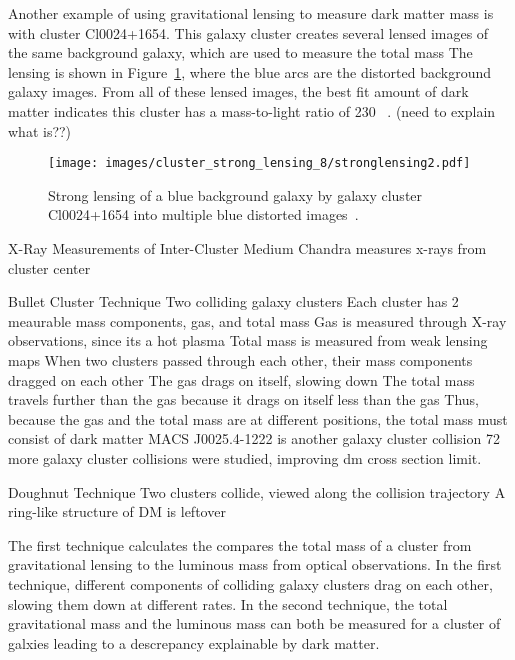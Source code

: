     Another example of using gravitational lensing to measure dark matter mass is with cluster Cl0024+1654.
    This galaxy cluster creates several lensed images of the same background galaxy, which are used to measure the total mass
    The lensing is shown in Figure~\ref{fig:stronglens}, where the blue arcs are the distorted background galaxy images.
    From all of these lensed images, the best fit amount of dark matter indicates this cluster has a mass-to-light ratio of 230 \hMLsol~\cite{cluster_strong_lensing_1996, cluster_strong_lensing_1998, cluster_strong_lensing_2010}.
    {\color{red}(need to explain what \hMLsol is??)}
    
    \begin{figure}
      \centering
      \texttt{[image: images/cluster\_strong\_lensing\_8/stronglensing2.pdf]}
      \caption[Gravitational Lensing in Cl0024+1654]{
        Strong lensing of a blue background galaxy by galaxy cluster Cl0024+1654 into multiple blue distorted images~\cite{cluster_strong_lensing_1996}.
      }
      \label{fig:stronglens}
    \end{figure}
    
    X-Ray Measurements of Inter-Cluster Medium
    Chandra measures x-rays from cluster center
    \cite{cluster_chandra}
    
    Bullet Cluster Technique
    Two colliding galaxy clusters
    Each cluster has 2 meaurable mass components, gas, and total mass
    Gas is measured through X-ray observations, since its a hot plasma
    Total mass is measured from weak lensing maps
    When two clusters passed through each other, their mass components dragged on each other
    The gas drags on itself, slowing down
    The total mass travels further than the gas because it drags on itself less than the gas
    Thus, because the gas and the total mass are at different positions, the total mass must consist of dark matter
    \cite{bullet_cluster_composite}
    \cite{bullet_cluster}
    \cite{bullet_cluster2}
    MACS J0025.4-1222 is another galaxy cluster collision
    \cite{cluster_MACS}
    72 more galaxy cluster collisions were studied, improving dm cross section limit.
    \cite{cluster_72}
    
    Doughnut Technique
    Two clusters collide, viewed along the collision trajectory
    A ring-like structure of DM is leftover
    \cite{dm_doughnut}
    

    

  
    The first technique calculates the 
compares the total mass of a cluster from gravitational lensing to the luminous mass from optical observations.
    In the first technique, different components of colliding galaxy clusters drag on each other, slowing them down at different rates.
    In the second technique, the total gravitational mass and the luminous mass can both be measured for a cluster of galxies leading to a descrepancy explainable by dark matter.
    
